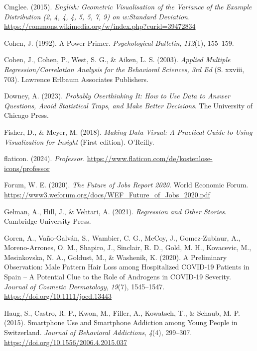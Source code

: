 \documentclass[
  a4paper,
]{scrbook}
\newlength{\cslhangindent}
\newenvironment{CSLReferences}[2] %
 {\begin{list}{}{%
  \setlength{\itemindent}{0pt}
  \setlength{\leftmargin}{0pt}
  \setlength{\parsep}{0pt}
  \ifodd #1
   \setlength{\leftmargin}{\cslhangindent}
   \setlength{\itemindent}{-1\cslhangindent}
  \fi
  \setlength{\itemsep}{#2\baselineskip}}}
 {\end{list}}
\theoremstyle{definition}
\theoremstyle{definition}
\theoremstyle{definition}
\theoremstyle{remark}
\begin{document}
\begin{CSLReferences}{1}{0}
Cmglee. (2015). \emph{English: {Geometric} Visualisation of the Variance
of the Example Distribution (2, 4, 4, 4, 5, 5, 7, 9) on w:{Standard}
Deviation.}
\url{https://commons.wikimedia.org/w/index.php?curid=39472834}

Cohen, J. (1992). A Power Primer. \emph{Psychological Bulletin},
\emph{112}(1), 155--159.

Cohen, J., Cohen, P., West, S. G., \& Aiken, L. S. (2003). \emph{Applied
Multiple Regression/Correlation Analysis for the Behavioral Sciences,
3rd Ed} (S. xxviii, 703). Lawrence Erlbaum Associates Publishers.

Downey, A. (2023). \emph{Probably Overthinking It: How to Use Data to
Answer Questions, Avoid Statistical Traps, and Make Better Decisions}.
The University of Chicago Press.

Fisher, D., \& Meyer, M. (2018). \emph{Making Data Visual: A Practical
Guide to Using Visualization for Insight} (First edition). O'Reilly.

flaticon. (2024). \emph{Professor}.
\url{https://www.flaticon.com/de/kostenlose-icons/professor}

Forum, W. E. (2020). \emph{The {Future} of {Jobs Report} 2020}. World
Economic Forum.
\url{https://www3.weforum.org/docs/WEF_Future_of_Jobs_2020.pdf}

Gelman, A., Hill, J., \& Vehtari, A. (2021). \emph{Regression and Other
Stories}. Cambridge University Press.

Goren, A., Vaño-Galván, S., Wambier, C. G., McCoy, J., Gomez-Zubiaur,
A., Moreno-Arrones, O. M., Shapiro, J., Sinclair, R. D., Gold, M. H.,
Kovacevic, M., Mesinkovska, N. A., Goldust, M., \& Washenik, K. (2020).
A Preliminary Observation: {Male} Pattern Hair Loss among Hospitalized
{COVID-19} Patients in {Spain} -- {A} Potential Clue to the Role of
Androgens in {COVID-19} Severity. \emph{Journal of Cosmetic
Dermatology}, \emph{19}(7), 1545--1547.
\url{https://doi.org/10.1111/jocd.13443}

Haug, S., Castro, R. P., Kwon, M., Filler, A., Kowatsch, T., \& Schaub,
M. P. (2015). Smartphone Use and Smartphone Addiction among Young People
in {Switzerland}. \emph{Journal of Behavioral Addictions}, \emph{4}(4),
299--307. \url{https://doi.org/10.1556/2006.4.2015.037}


\end{CSLReferences}
\end{document}
